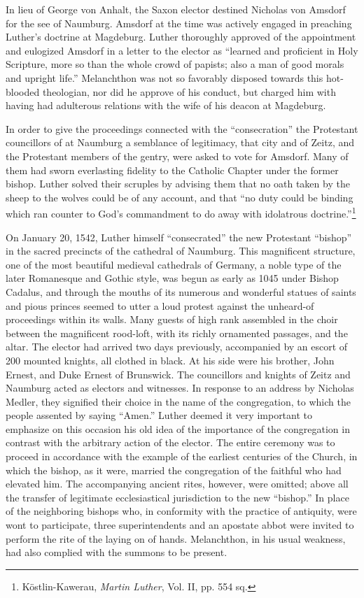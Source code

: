 In lieu of George von Anhalt, the Saxon elector destined Nicholas
von Amsdorf for the see of Naumburg. Amsdorf at the time was actively
engaged in preaching Luther’s doctrine at Magdeburg. Luther
thoroughly approved of the appointment and eulogized Amsdorf in a
letter to the elector as “learned and proficient in Holy Scripture, more
so than the whole crowd of papists; also a man of good morals and upright
life.” Melanchthon was not so favorably disposed towards this
hot-blooded theologian, nor did he approve of his conduct, but charged
him with having had adulterous relations with the wife of his deacon
at Magdeburg.

In order to give the proceedings connected with the “consecration”
the Protestant councillors of at Naumburg a semblance of legitimacy,
that city and of Zeitz, and the Protestant members of the gentry,
were asked to vote for Amsdorf. Many of them had sworn everlasting fidelity
to the Catholic Chapter under the former bishop. Luther
solved their scruples by advising them that no oath taken by the
sheep to the wolves could be of any account, and that “no duty could
be binding which ran counter to God’s commandment to do away
with idolatrous doctrine.”\footnote{Köstlin-Kawerau, \textit{Martin Luther}, Vol. II, pp. 554 sq.}

On January 20, 1542, Luther himself “consecrated” the new Protestant
“bishop” in the sacred precincts of the cathedral of Naumburg.
This magnificent structure, one of the most beautiful medieval cathedrals
of Germany, a noble type of the later Romanesque and Gothic
style, was begun as early as 1045 under Bishop Cadalus, and through
the mouths of its numerous and wonderful statues of saints and pious
princes seemed to utter a loud protest against the unheard-of proceedings
within its walls. Many guests of high rank assembled in the choir
between the magnificent rood-loft, with its richly ornamented passages,
and the altar. The elector had arrived two days previously, accompanied
by an escort of 200 mounted knights, all clothed in black.
At his side were his brother, John Ernest, and Duke Ernest of Brunswick.
The councillors and knights of Zeitz and Naumburg acted as
electors and witnesses. In response to an address by Nicholas Medler,
they signified their choice in the name of the congregation, to which
the people assented by saying “Amen.” Luther deemed it very important
to emphasize on this occasion his old idea of the importance
of the congregation in contrast with the arbitrary action of the elector.
The entire ceremony was to proceed in accordance with the example of
the earliest centuries of the Church, in which the bishop,
as it were, married the congregation of the faithful who had elevated
him. The accompanying ancient rites, however, were omitted; above
all the transfer of legitimate ecclesiastical jurisdiction to the new
“bishop.” In place of the neighboring bishops who, in conformity with
the practice of antiquity, were wont to participate, three superintendents
and an apostate abbot were invited to perform the rite of the
laying on of hands. Melanchthon, in his usual weakness, had also complied
with the summons to be present.

